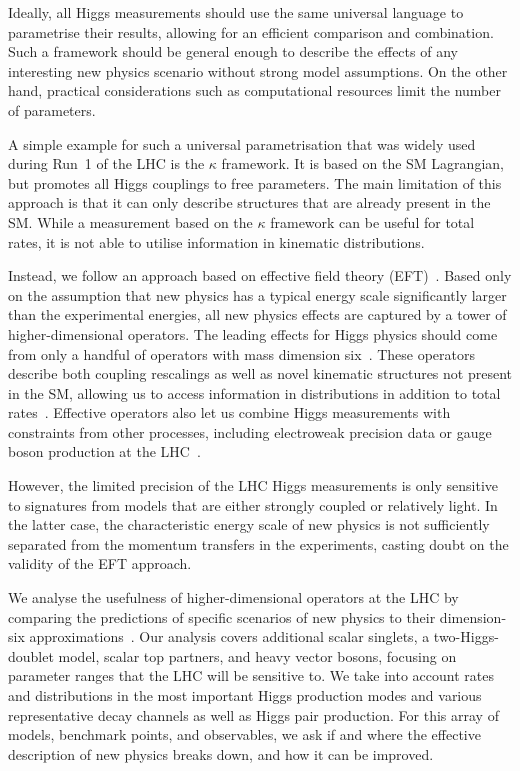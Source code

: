 \newparagraph
%
Ideally, all Higgs measurements should use the same universal language
to parametrise their results, allowing for an efficient comparison and
combination. Such a framework should be general enough to describe the
effects of any interesting new physics scenario without strong model
assumptions.  On the other hand, practical considerations such as
computational resources limit the number of parameters.
%

A simple example for such a universal parametrisation that was widely
used during Run~1 of the LHC is the $\kappa$ framework. It is based on
the SM Lagrangian, but promotes all Higgs couplings to free
parameters. The main limitation of this approach is that it can only
describe structures that are already present in the SM. While a
measurement based on the $\kappa$ framework can be useful for total
rates, it is not able to utilise information in kinematic
distributions.

Instead, we follow an approach based on effective field theory
(EFT)~\cite{Coleman:1969sm, Callan:1969sn, Weinberg:1980wa}. Based
only on the assumption that new physics has a typical energy scale
significantly larger than the experimental energies, all new physics
effects are captured by a tower of higher-dimensional operators. The
leading effects for Higgs physics should come from only a handful of
operators with mass dimension six~\cite{Burges:1983zg, Leung:1984ni,
  Buchmuller:1985jz}. These operators
%
%
describe both coupling rescalings as well as novel kinematic
structures not present in the SM, allowing us to access information in
distributions in addition to total rates~\cite{Corbett:2012ja,
  Corbett:2015ksa}. Effective operators also let us combine Higgs
measurements with constraints from other processes, including
electroweak precision data or gauge boson production at the
LHC~\cite{Butter:2016cvz}.

However, the limited precision of the LHC Higgs measurements is only
sensitive to signatures from models that are either strongly coupled
or relatively light. In the latter case, the characteristic energy
scale of new physics is not sufficiently separated from the momentum
transfers in the experiments, casting doubt on the validity of the EFT
approach.

We analyse the usefulness of higher-dimensional operators at the LHC
by comparing the predictions of specific scenarios of new physics to
their dimension-six approximations~\cite{Brehmer:2015rna}. Our
analysis covers additional scalar singlets, a two-Higgs-doublet model,
scalar top partners, and heavy vector bosons, focusing on parameter
ranges that the LHC will be sensitive to. We take into account rates
and distributions in the most important Higgs production modes and
various representative decay channels as well as Higgs pair
production. For this array of models, benchmark points, and
observables, we ask if and where the effective description of new
physics breaks down, and how it can be improved.

